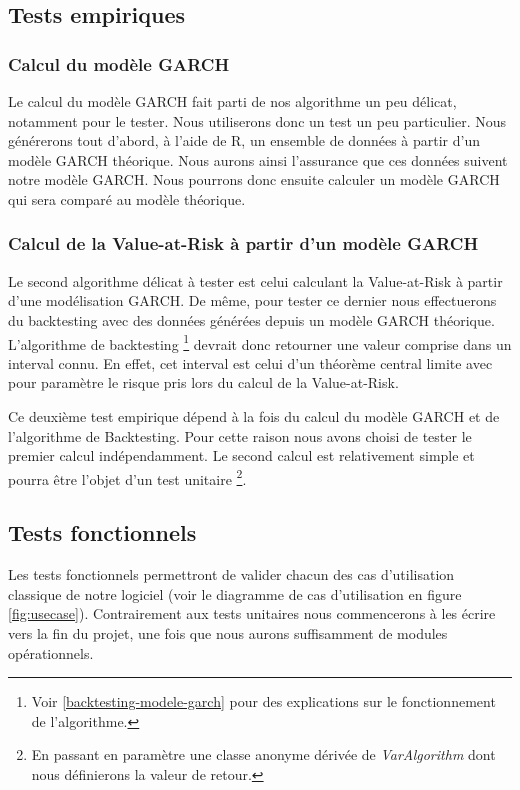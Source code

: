 \documentclass[a4paper]{report}
\begin{document}
\subsection{Tests empiriques}

\subsubsection{Calcul du modèle GARCH}

Le calcul du modèle GARCH fait parti de nos algorithme un peu délicat, notamment pour le tester.
Nous utiliserons donc un test un peu particulier.
Nous générerons tout d'abord, à l'aide de R, un ensemble de données à partir d'un modèle GARCH théorique.
Nous aurons ainsi l'assurance que ces données suivent notre modèle GARCH.
Nous pourrons donc ensuite calculer un modèle GARCH qui sera comparé au modèle théorique.

\subsubsection{Calcul de la Value-at-Risk à partir d'un modèle GARCH}

Le second algorithme délicat à tester est celui calculant la Value-at-Risk à partir d'une modélisation GARCH.
De même, pour tester ce dernier nous effectuerons du backtesting avec des données générées depuis un modèle GARCH théorique.
L'algorithme de backtesting \footnote{Voir \ref{backtesting-modele-garch} pour des explications sur le fonctionnement de l'algorithme.} devrait donc retourner une valeur comprise dans un interval connu. 
En effet, cet interval est celui d'un théorème central limite avec pour paramètre le risque pris lors du calcul de la Value-at-Risk.

Ce deuxième test empirique dépend à la fois du calcul du modèle GARCH et de l'algorithme de Backtesting. Pour cette raison nous avons choisi de tester le premier calcul indépendamment. Le second calcul est relativement simple et pourra être l'objet d'un test unitaire \footnote{En passant en paramètre une classe anonyme dérivée de \textit{VarAlgorithm} dont nous définierons la valeur de retour.}.


\subsection{Tests fonctionnels}

Les tests fonctionnels permettront de valider chacun des cas d'utilisation classique de notre logiciel (voir le diagramme de cas d'utilisation en figure \ref{fig:usecase}).
Contrairement aux tests unitaires nous commencerons à les écrire vers la fin du projet, une fois que nous aurons suffisamment de modules opérationnels.
\end{document}
